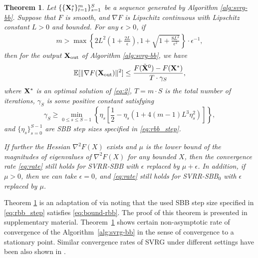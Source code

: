 \documentclass[letterpaper]{article} %
\newtheorem{theorem}{Theorem}
\begin{document}
\begin{theorem}
\label{svrg_bb_nonconvex}
Let $\{\{{\bf X}_t^s\}_{t=1}^m\}_{s=1}^S$ be a sequence generated by Algorithm \ref{alg:svrg-bb}.
Suppose that $F$ is smooth, and $\nabla F$ is Lipschitz continuous with Lipschitz constant $L>0$ and bounded. For any $\epsilon>0$, if
\begin{align}
\label{Eq:cond-m}
m > \max \left\{ 2L^2\left(1+\frac{2L}{\epsilon}\right), 1+ \sqrt{1+\frac{8L^2}{\epsilon^2}}\right\} \cdot \epsilon^{-1},
\end{align}
then for the output ${\bf X}_{\mathrm{out}}$ of Algorithm \ref{alg:svrg-bb}, we have
\begin{align}
\label{eq:rate}
\mathbb{E}[\|\nabla F({\bf X}_{\mathrm{out}})\|^2] \leq \frac{F(\tilde{\bf X}^0)-F({\bf X}^*)}{T \cdot \gamma_S},
\end{align}
where ${\bf X}^*$ is an optimal solution of \eqref{eq:2}, $T = m \cdot S$ is the total number of iterations, $\gamma_S$ is some positive constant satisfying
\[
\gamma_S \geq \min_{0\leq s \leq S-1} \left\{ \eta_s \left[ \frac{1}{2} - \eta_s\left(1+4(m-1)L^3\eta_s^2\right)\right]\right\},
\]
and $\{\eta_s\}_{s=0}^{S-1}$ are SBB step sizes specified in \eqref{eq:rbb_step}.

If further the Hessian $\nabla^2 F(X)$ exists and $\mu$ is the lower bound of the magnitudes of eigenvalues of $\nabla^2 F(X)$ for any bounded $X$, then the convergence rate \eqref{eq:rate} still holds for SVRR-SBB  with $\epsilon$ replaced by $\mu+\epsilon$. In addition, if $\mu>0$, then we can take $\epsilon=0$, and \eqref{eq:rate} still holds for SVRR-SBB$_0$ with $\epsilon$ replaced by $\mu$.
\end{theorem}

Theorem \ref{svrg_bb_nonconvex} is an adaptation of \cite[Theorem 2]{pmlr-v48-reddi16} via noting that the used SBB step size specified in \eqref{eq:rbb_step} satisfies \eqref{eq:bound-rbb}.
The proof of this theorem is presented in supplementary material. Theorem~\ref{svrg_bb_nonconvex} shows certain non-asymptotic rate of convergence of the Algorithm~\ref{alg:svrg-bb} in the sense of convergence to a stationary point.
Similar convergence rates of SVRG under different settings have been also shown in \cite{pmlr-v48-reddi16,pmlr-v48-allen-zhua16}.
\end{document}
